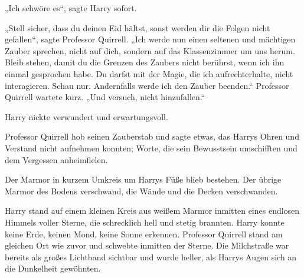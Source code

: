 „Ich schwöre es“, sagte Harry sofort.

„Stell sicher, dass du deinen Eid hältst, sonst werden dir die Folgen nicht gefallen“, sagte Professor Quirrell.
„Ich werde nun einen seltenen und mächtigen Zauber sprechen, nicht auf dich, sondern auf das Klassenzimmer um uns herum. Bleib stehen, damit du die Grenzen des Zaubers nicht berührst, wenn ich ihn einmal gesprochen habe. Du darfst mit der Magie, die ich aufrechterhalte, nicht interagieren. Schau nur. Andernfalls werde ich den Zauber beenden.“ Professor Quirrell wartete kurz.
„Und versuch, nicht hinzufallen.“

Harry nickte verwundert und erwartungsvoll.

Professor Quirrell hob seinen Zauberstab und sagte etwas, das Harrys Ohren und Verstand nicht aufnehmen konnten; Worte, die sein Bewusstsein umschifften und dem Vergessen anheimfielen.

Der Marmor in kurzem Umkreis um Harrys Füße blieb bestehen. Der übrige Marmor des Bodens verschwand, die Wände und die Decken verschwanden.

Harry stand auf einem kleinen Kreis aus weißem Marmor inmitten eines endlosen Himmels voller Sterne, die schrecklich hell und stetig brannten. Harry konnte keine Erde, keinen Mond, keine Sonne erkennen. Professor Quirrell stand am gleichen Ort wie zuvor und schwebte inmitten der Sterne. Die Milchstraße war bereits als großes Lichtband sichtbar und wurde heller, als Harrys Augen sich an die Dunkelheit gewöhnten.


